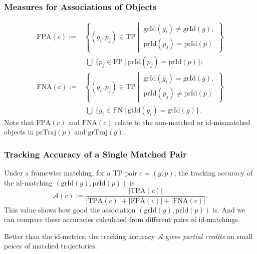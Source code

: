 \documentclass[slidetop, mathserif]{beamer}
\begin{document}
\begin{frame}
	\frametitle{Measures for Associations of Objects}
			
	\vspace{-20pt}
	\begin{align*}
		\text{FPA}(c) := &             
		\left\{(g_i, p_j)\in\text{TP}\ \left|\ 
		\begin{array}{c}
		\text{grId}(g_i) \neq \text{grId}(g), \\
		\text{prId}(p_j) = \text{prId}(p)
		\end{array}\right.
		\right\} \\
		                 & ~ \bigcup ~ 
		\Big\{p_j\in\text{FP}\ |\ 
		\text{prId}(p_j) = \text{prId}(p)
		\Big\}; \\
		\text{FNA}(c) := &             
		\left\{(g_i, p_j)\in\text{TP}\ \left|\ 
		\begin{array}{c}
		\text{grId}(g_i) = \text{grId}(g), \\
		\text{prId}(p_j) \neq \text{prId}(p)
		\end{array}\right.
		\right\} \\
		                 & ~ \bigcup ~ 
		\Big\{g_i\in\text{FN}\ |\ 
		\text{gtId}(g_i) = \text{gtId}(g)
		\Big\}.
	\end{align*}
	Note that $\text{FPA}(c)$ and $\text{FNA}(c)$ relate to the non-matched
	or id-mismatched objects in $\text{prTraj}(p)$ and $\text{grTraj}(g)$.
			
\end{frame}

\begin{frame}
	\frametitle{Tracking Accuracy of a Single Matched Pair}

	Under a framewise matching, for a TP pair $c=(g,p)$,
	the tracking accuracy of the id-matching $(\text{grId}(g), \text{prId}(p))$
	is
	\[
		\mathcal A(c) := 
		\dfrac{|\text{TPA}(c)|}{|\text{TPA}(c)|+|\text{FPA}(c)|+|\text{FNA}(c)|}.
	\]
	This value shows how good the association $(\text{grId}(g), \text{prId}(p))$ is.
	And we can compare these accuracies calculated from different pairs
	of id-matchings.

	\vspace{5pt}

	Better than the id-metrics, the tracking accuracy $\mathcal A$ gives
	\emph{partial credits} on small peices of matched trajectories.

\end{frame}
\end{document}
